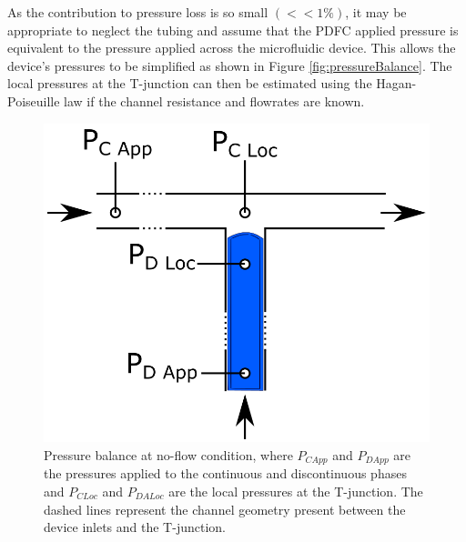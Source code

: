 As the contribution to pressure loss is so small $(<< 1 \%)$, it may be appropriate to neglect the tubing and assume that the PDFC applied pressure is equivalent to the pressure applied across the microfluidic device. This allows the device's pressures to be simplified as shown in Figure \vref{fig:pressureBalance}. The local pressures at the T-junction can then be estimated using the Hagan-Poiseuille law if the channel resistance and flowrates are known.

\begin{figure}[H]
\centering 
\includegraphics[width=0.75\columnwidth]{pressureBalance.PNG} 
\caption[Pressure Balance at no-flow condition.]{Pressure balance at no-flow condition, where $P_{C App}$ and $P_{D App}$ are the pressures applied to the continuous and discontinuous phases and $P_{C Loc}$ and $P_{D ALoc}$ are the local pressures at the T-junction. The dashed lines represent the channel geometry present between the device inlets and the T-junction.} 
\label{fig:pressureBalance} 
\end{figure}

